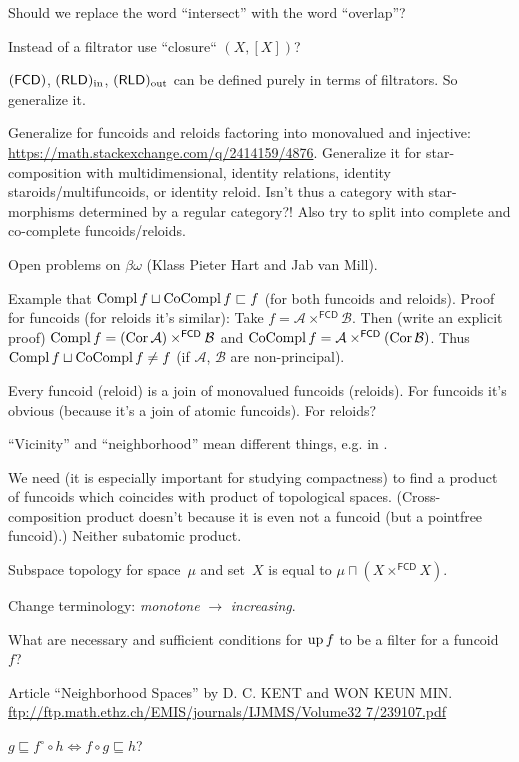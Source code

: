 \documentclass{amsart}
\begin{document}
Should we replace the word ``intersect'' with the word ``overlap''?

Instead of a filtrator use ``closure`` $(X,[X])$?

$(\mathsf{FCD})$, $(\mathsf{RLD})_{\mathrm{in}}$, $(\mathsf{RLD})_{\mathrm{out}}$ can be defined purely in terms of filtrators.
So generalize it.

Generalize for funcoids and reloids factoring into monovalued and injective:\\
\url{https://math.stackexchange.com/q/2414159/4876}.
Generalize it for star-composition with multidimensional, identity relations, identity staroids/multifuncoids, or identity reloid.
Isn't thus a category with star-morphisms determined by a regular category?!
Also try to split into complete and co-complete funcoids/reloids.

Open problems on $\beta\omega$ (Klass Pieter Hart and Jab van Mill).

Example that $\operatorname{Compl} f\sqcup\operatorname{CoCompl} f\sqsubset f$ (for both funcoids and reloids).
Proof for funcoids (for reloids it's similar): Take $f=\mathcal{A}\times^{\mathsf{FCD}}\mathcal{B}$. Then (write an explicit proof)
$\operatorname{Compl} f=(\operatorname{Cor}\mathcal{A})\times^{\mathsf{FCD}}\mathcal{B}$ and $\operatorname{CoCompl} f=\mathcal{A}\times^{\mathsf{FCD}}(\operatorname{Cor}\mathcal{B})$.
Thus $\operatorname{Compl} f\sqcup\operatorname{CoCompl} f\ne f$ (if $\mathcal{A}$, $\mathcal{B}$ are non-principal).

Every funcoid (reloid) is a join of monovalued funcoids (reloids). For funcoids it's obvious
(because it's a join of atomic funcoids). For reloids?

``Vicinity'' and ``neighborhood'' mean different things, e.g. in \cite{converg}.

We need (it is especially important for studying compactness) to find a product of funcoids which coincides with
product of topological spaces. (Cross-composition product doesn't because it is even not a funcoid (but a pointfree funcoid).)
Neither subatomic product.

Subspace topology for space~$\mu$ and set~$X$ is equal to $\mu\sqcap(X\times^{\mathsf{FCD}} X)$.

Change terminology: \emph{monotone} $\rightarrow$ \emph{increasing}.

What are necessary and sufficient conditions for $\operatorname{up} f$ to be a filter for a funcoid~$f$?

Article ``Neighborhood Spaces'' by D. C. KENT and WON KEUN MIN.
\url{ftp://ftp.math.ethz.ch/EMIS/journals/IJMMS/Volume32 7/239107.pdf}

$g\sqsubseteq f^{\circ}\circ h \Leftrightarrow f\circ g\sqsubseteq h$?
\end{document}
